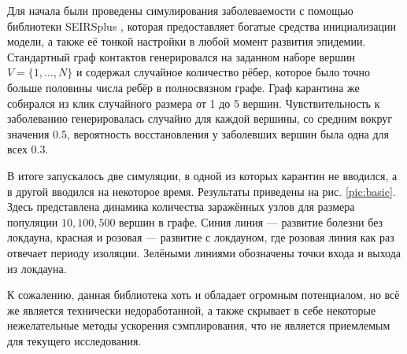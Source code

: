 	Для начала были проведены симулирования заболеваемости с помощью библиотеки SEIRSplus \cite{seirsplus}, которая предоставляет богатые средства инициализации модели, а также её тонкой настройки в любой момент развития эпидемии. Стандартный граф контактов генерировался на заданном наборе вершин $ V = \{1, \ldots, N\} $ и содержал случайное количество рёбер, которое было точно больше половины числа ребёр в полносвязном графе. Граф карантина же собирался из клик случайного размера от 1 до 5 вершин. Чувствительность к заболеванию генерировалась случайно для каждой вершины, со средним вокруг значения $ 0.5 $, вероятность восстановления у заболевших вершин была одна для всех $ 0.3 $. 
	
	В итоге запускалось две симуляции, в одной из которых карантин не вводился, а в другой вводился на некоторое время. Результаты приведены на рис. \ref{pic:basic}. Здесь представлена динамика количества заражённых узлов для размера популяции $ 10, 100, 500 $ вершин в графе. Синия линия --- развитие болезни без локдауна, красная и розовая --- развитие с локдауном, где розовая линия как раз отвечает периоду изоляции. Зелёными линиями обозначены точки входа и выхода из локдауна.
	
	К сожалению, данная библиотека хоть и обладает огромным потенциалом, но всё же является технически недоработанной, а также скрывает в себе некоторые нежелательные методы ускорения сэмплирования, что не является приемлемым для текущего исследования. 
	
